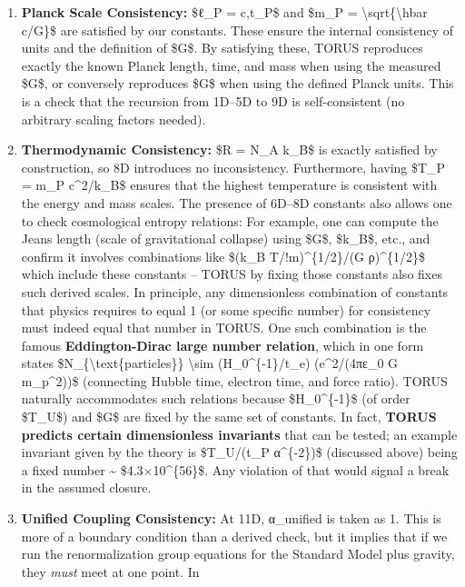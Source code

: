 \documentclass[]{article}
\begin{document}
\begin{enumerate}
\def\labelenumi{\arabic{enumi}.}
\item
  \textbf{Planck Scale Consistency:} \$ℓ\_P = c,t\_P\$ and \$m\_P =
  \textbackslash{}sqrt\{\textbackslash{}hbar c/G\}\$ are satisfied by
  our constants​. These ensure the internal consistency of units and the
  definition of \$G\$. By satisfying these, TORUS reproduces exactly the
  known Planck length, time, and mass when using the measured \$G\$, or
  conversely reproduces \$G\$ when using the defined Planck units. This
  is a check that the recursion from 1D--5D to 9D is self-consistent (no
  arbitrary scaling factors needed).
\item
  \textbf{Thermodynamic Consistency:} \$R = N\_A k\_B\$ is exactly
  satisfied by construction​, so 8D introduces no inconsistency.
  Furthermore, having \$T\_P = m\_P c\^{}2/k\_B\$ ensures that the
  highest temperature is consistent with the energy and mass scales​.
  The presence of 6D--8D constants also allows one to check cosmological
  entropy relations: For example, one can compute the Jeans length
  (scale of gravitational collapse) using \$G\$, \$k\_B\$, etc., and
  confirm it involves combinations like \$(k\_B T/!m)\^{}\{1/2\}/(G
  ρ)\^{}\{1/2\}\$ which include these constants -- TORUS by fixing those
  constants also fixes such derived scales. In principle, any
  dimensionless combination of constants that physics requires to equal
  1 (or some specific number) for consistency must indeed equal that
  number in TORUS. One such combination is the famous
  \textbf{Eddington-Dirac large number relation}, which in one form
  states \$N\_\{\textbackslash{}text\{particles\}\} \textbackslash{}sim
  (H\_0\^{}\{-1\}/t\_e) (e\^{}2/(4πε\_0 G m\_p\^{}2))\$ (connecting
  Hubble time, electron time, and force ratio). TORUS naturally
  accommodates such relations because \$H\_0\^{}\{-1\}\$ (of order
  \$T\_U\$) and \$G\$ are fixed by the same set of constants. In fact,
  \textbf{TORUS predicts certain dimensionless invariants} that can be
  tested; an example invariant given by the theory is \$T\_U/(t\_P
  α\^{}\{-2\})\$ (discussed above) being a fixed number
  \textasciitilde{} \$4.3×10\^{}\{56\}\$​. Any violation of that would
  signal a break in the assumed closure.
\item
  \textbf{Unified Coupling Consistency:} At 11D, α\_unified is taken as
  1. This is more of a boundary condition than a derived check, but it
  implies that if we run the renormalization group equations for the
  Standard Model plus gravity, they \emph{must} meet at one point. In

\end{enumerate}
\end{document}
